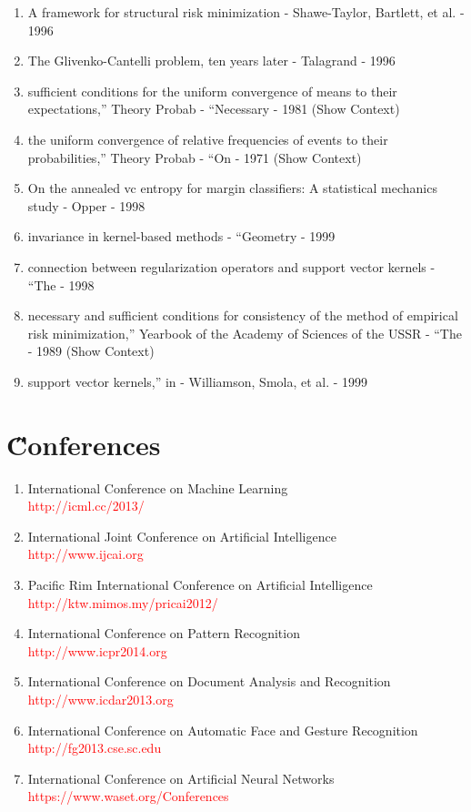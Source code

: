 \documentclass[a4paper,12pt,oneside]{book}
\newcommand{\red}[1]{  \textcolor{red}  {#1}}   %
\begin{document}
\begin{enumerate}
\item A framework for structural risk minimization - Shawe-Taylor, Bartlett, et al. - 1996
\item The Glivenko-Cantelli problem, ten years later - Talagrand - 1996
\item sufficient conditions for the uniform convergence of means to their expectations,” Theory Probab - “Necessary - 1981 (Show Context)
\item the uniform convergence of relative frequencies of events to their probabilities,” Theory Probab - “On - 1971 (Show Context)
\item On the annealed vc entropy for margin classifiers: A statistical mechanics study - Opper - 1998
\item invariance in kernel-based methods - “Geometry - 1999
\item connection between regularization operators and support vector kernels - “The - 1998
\item necessary and sufficient conditions for consistency of the method of empirical risk minimization,” Yearbook of the Academy of Sciences of the USSR - “The - 1989 (Show Context)
\item support vector kernels,” in - Williamson, Smola, et al. - 1999
\end{enumerate}



\section{\H Conferences}
\begin{enumerate}
\item International Conference on Machine Learning
\\\qquad \red{http://icml.cc/2013/}
\item International Joint Conference on Artificial Intelligence
\\\qquad \red{http://www.ijcai.org}
\item Pacific Rim International Conference on Artificial Intelligence
\\\quad \red{http://ktw.mimos.my/pricai2012/}
\item International Conference on Pattern Recognition
\\\qquad \red{http://www.icpr2014.org}
\item International Conference on Document Analysis and Recognition
\\\qquad \red{http://www.icdar2013.org}
\item International Conference on Automatic Face and Gesture Recognition
\\\qquad \red{http://fg2013.cse.sc.edu}
\item International Conference on Artificial Neural Networks
\\\qquad \red{https://www.waset.org/Conferences}
\end{enumerate}
\end{document}
